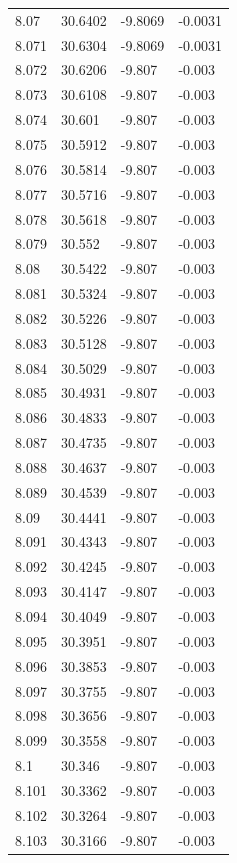 \begin{tabular}{llll}
8.07 & 30.6402 & -9.8069 & -0.0031 \\
8.071 & 30.6304 & -9.8069 & -0.0031 \\
8.072 & 30.6206 & -9.807 & -0.003 \\
8.073 & 30.6108 & -9.807 & -0.003 \\
8.074 & 30.601 & -9.807 & -0.003 \\
8.075 & 30.5912 & -9.807 & -0.003 \\
8.076 & 30.5814 & -9.807 & -0.003 \\
8.077 & 30.5716 & -9.807 & -0.003 \\
8.078 & 30.5618 & -9.807 & -0.003 \\
8.079 & 30.552 & -9.807 & -0.003 \\
8.08 & 30.5422 & -9.807 & -0.003 \\
8.081 & 30.5324 & -9.807 & -0.003 \\
8.082 & 30.5226 & -9.807 & -0.003 \\
8.083 & 30.5128 & -9.807 & -0.003 \\
8.084 & 30.5029 & -9.807 & -0.003 \\
8.085 & 30.4931 & -9.807 & -0.003 \\
8.086 & 30.4833 & -9.807 & -0.003 \\
8.087 & 30.4735 & -9.807 & -0.003 \\
8.088 & 30.4637 & -9.807 & -0.003 \\
8.089 & 30.4539 & -9.807 & -0.003 \\
8.09 & 30.4441 & -9.807 & -0.003 \\
8.091 & 30.4343 & -9.807 & -0.003 \\
8.092 & 30.4245 & -9.807 & -0.003 \\
8.093 & 30.4147 & -9.807 & -0.003 \\
8.094 & 30.4049 & -9.807 & -0.003 \\
8.095 & 30.3951 & -9.807 & -0.003 \\
8.096 & 30.3853 & -9.807 & -0.003 \\
8.097 & 30.3755 & -9.807 & -0.003 \\
8.098 & 30.3656 & -9.807 & -0.003 \\
8.099 & 30.3558 & -9.807 & -0.003 \\
8.1 & 30.346 & -9.807 & -0.003 \\
8.101 & 30.3362 & -9.807 & -0.003 \\
8.102 & 30.3264 & -9.807 & -0.003 \\
8.103 & 30.3166 & -9.807 & -0.003 \\

\end{tabular}
